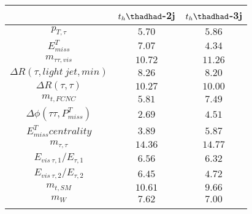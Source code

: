 \centering
\begin{tabular}{ccc} \toprule\toprule
  & $t_h\thadhad$-2j & $t_h\thadhad$-3j\\\midrule
$p_{T,\tau }$ & $5.70$ & $5.86$\\
$E^{T}_{miss}$ & $7.07$ & $4.34$\\
$m_{\tau \tau ,vis}$ & $10.72$ & $11.26$\\
$\Delta R(\tau ,light~jet,min)$ & $8.26$ & $8.20$\\
$\Delta R(\tau ,\tau )$ & $10.27$ & $10.00$\\
$m_{t,FCNC}$ & $5.81$ & $7.49$\\
$\Delta\phi(\tau \tau ,P^{T}_{miss})$ & $2.69$ & $4.51$\\
$E^{T}_{miss} centrality$ & $3.89$ & $5.87$\\
$m_{\tau ,\tau }$ & $14.36$ & $14.77$\\
$E_{vis~\tau ,1}/E_{\tau ,1}$ & $6.56$ & $6.32$\\
$E_{vis~\tau ,2}/E_{\tau ,2}$ & $6.45$ & $4.72$\\
$m_{t,SM}$ & $10.61$ & $9.66$\\
$m_{W}$ & $7.62$ & $7.00$\\
\bottomrule\bottomrule\\
\end{tabular}
